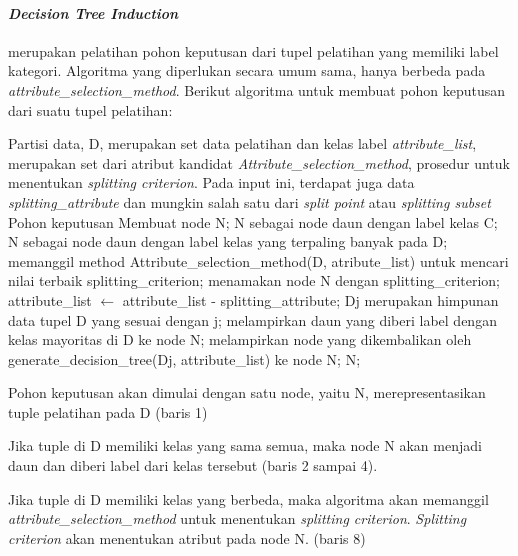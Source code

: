 \paragraph{\textsl{Decision Tree Induction}} merupakan pelatihan pohon keputusan dari tupel pelatihan yang memiliki label kategori. Algoritma yang diperlukan secara umum sama, hanya berbeda pada \textsl{attribute\_selection\_method}. Berikut algoritma untuk membuat pohon keputusan dari suatu tupel pelatihan:


\begin{algorithmic}[1]
	\REQUIRE Partisi data, D, merupakan set data pelatihan dan kelas label
	\REQUIRE \textsl{attribute\_list}, merupakan set dari atribut kandidat
	\REQUIRE \textsl{Attribute\_selection\_method}, prosedur untuk menentukan \textsl{splitting criterion}. Pada input ini, terdapat juga data \textsl{splitting\_attribute} dan mungkin salah satu dari \textsl{split point} atau \textsl{splitting subset}
	\ENSURE Pohon keputusan
	\STATE Membuat node N;
	  \RETURN N sebagai node daun dengan label kelas C;
	\ENDIF
		\RETURN N sebagai node daun dengan label kelas yang terpaling banyak pada D; 
	\ENDIF
	\STATE memanggil method Attribute\_selection\_method(D, atribute\_list) untuk mencari nilai terbaik splitting\_criterion;
	\STATE menamakan node N dengan splitting\_criterion;
		\STATE attribute\_list $\leftarrow$ attribute\_list - splitting\_attribute; 
	\ENDIF
		\STATE D\lowercase{j} merupakan himpunan data tupel D yang sesuai dengan j;
			\STATE melampirkan daun yang diberi label dengan kelas mayoritas di D ke node N;
		\ELSE
			\STATE melampirkan node yang dikembalikan oleh generate\_decision\_tree(D\lowercase{j}, attribute\_list) ke node N;
		\ENDIF
	\ENDFOR
\RETURN N;
\end{algorithmic}

Pohon keputusan akan dimulai dengan satu node, yaitu N, merepresentasikan tuple pelatihan pada D (baris 1)

Jika tuple di D memiliki kelas yang sama semua, maka node N akan menjadi daun dan diberi label dari kelas tersebut (baris 2 sampai 4). 

Jika tuple di D memiliki kelas yang berbeda, maka algoritma akan memanggil \textsl{attribute\_selection\_method} untuk menentukan \textsl{splitting criterion}. \textsl{Splitting criterion} akan menentukan atribut pada node N. (baris 8)


